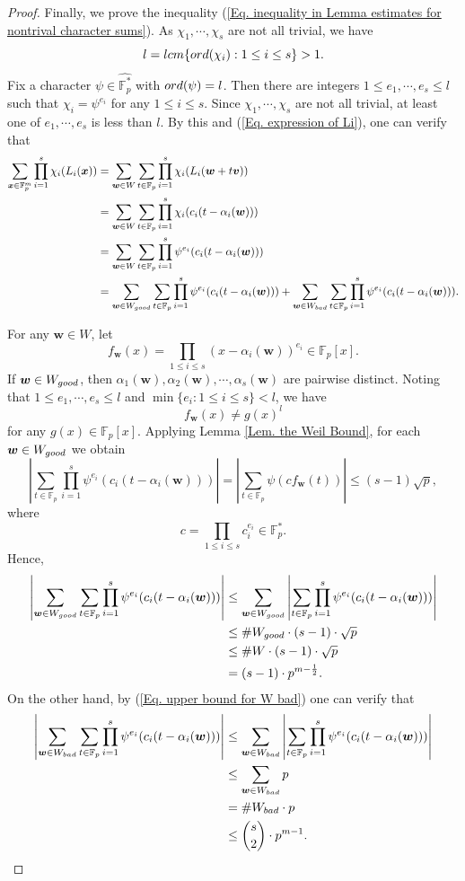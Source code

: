 \documentclass[10pt,a4paper]{amsart}
\def\lcm{\rm{lcm}}
\def\ord{{\rm ord}}
\def\v{{\bm v}}
\def\w{{\bm w}}
\def\x{{\bm x}}
\def\bad{{\rm bad}}
\def\good{{\rm good}}
\def\lcm{{\rm lcm}}
\begin{document}
\begin{proof}
Finally, we prove the inequality (\ref{Eq. inequality in Lemma estimates for nontrival character sums}). As $\chi_1,\cdots,\chi_s$ are not all trivial, we have 
$$l=\lcm\{\ord(\chi_i): 1\le i\le s\}>1.$$
Fix a character $\psi\in\widehat{\mathbb{F}_p^*}$ with $\ord(\psi)=l$. Then there are integers $1\le e_1,\cdots, e_s\le l$ such that $\chi_i=\psi^{e_i}$ for any $1\le i\le s$. Since $\chi_1,\cdots,\chi_s$ are not all trivial, at least one of $e_1,\cdots,e_s$ is less than $l$. By this and (\ref{Eq. expression of Li}), one can verify that 
\begin{align}\label{Eq. sum is equal to good plus bad}
	\sum_{\x\in\mathbb{F}_p^m}\prod_{i=1}^{s}\chi_i(L_i(\x))
&=\sum_{\w\in W}\sum_{t\in\mathbb{F}_p}\prod_{i=1}^{s}\chi_i(L_i(\w+t\v))\notag\\
&=\sum_{\w\in W}\sum_{t\in\mathbb{F}_p}\prod_{i=1}^{s}\chi_i(c_i(t-\alpha_i(\w)))\notag\\
&=\sum_{\w\in W}\sum_{t\in\mathbb{F}_p}\prod_{i=1}^{s}\psi^{e_i}(c_i(t-\alpha_i(\w)))\notag\\
&=\sum_{\w\in W_{\good}}\sum_{t\in\mathbb{F}_p}\prod_{i=1}^{s}\psi^{e_i}(c_i(t-\alpha_i(\w)))+\sum_{\w\in W_{\bad}}\sum_{t\in\mathbb{F}_p}\prod_{i=1}^{s}\psi^{e_i}(c_i(t-\alpha_i(\w))).
\end{align}
	
	For any $\w\in W$, let 
	$$f_{\w}(x)=\prod_{1\le i\le s}\left(x-\alpha_i(\w)\right)^{e_i}\in\mathbb{F}_p[x].$$
	If $\w\in W_{\good}$, then $\alpha_1(\w),\alpha_2(\w),\cdots, \alpha_s(\w)$ are pairwise distinct. Noting that $1\le e_1,\cdots,e_s\le l$ and $\min\{e_i: 1\le i\le s\}<l$, we have 
		$$f_{\w}(x)\neq g(x)^l$$
		for any $g(x)\in\mathbb{F}_p[x]$.  Applying Lemma \ref{Lem. the Weil Bound}, for each $\w\in W_{\good}$ we obtain 
$$\left|\sum_{t\in\mathbb{F}_p}\prod_{i=1}^{s}\psi^{e_i}(c_i(t-\alpha_i(\w)))\right|=\left|\sum_{t\in\mathbb{F}_p}\psi\left(cf_{\w}(t)\right)\right|\le (s-1)\sqrt{p},$$
where 
$$c=\prod_{1\le i\le s}c_i^{e_i}\in\mathbb{F}_p^*.$$
Hence, 
\begin{align}\label{Eq. estimate for good w}
	     \left|\sum_{\w\in W_{\good}}\sum_{t\in\mathbb{F}_p}\prod_{i=1}^{s}\psi^{e_i}(c_i(t-\alpha_i(\w)))\right|
&\le  \sum_{\w\in W_{\good}}\left|\sum_{t\in\mathbb{F}_p}\prod_{i=1}^{s}\psi^{e_i}(c_i(t-\alpha_i(\w)))\right|\notag\\
&\le \#W_{\good}\cdot (s-1)\cdot \sqrt{p}\notag\\
&\le \#W\cdot (s-1)\cdot \sqrt{p}\notag\\
&=(s-1)\cdot p^{m-\frac{1}{2}}.
\end{align}		
On the other hand, by (\ref{Eq. upper bound for W bad}) one can verify that 
\begin{align}\label{Eq. estimate for bad w}
	\left|\sum_{\w\in W_{\bad}}\sum_{t\in\mathbb{F}_p}\prod_{i=1}^{s}\psi^{e_i}(c_i(t-\alpha_i(\w)))\right|
&\le  \sum_{\w\in W_{\bad}}\left|\sum_{t\in\mathbb{F}_p}\prod_{i=1}^{s}\psi^{e_i}(c_i(t-\alpha_i(\w)))\right|\notag\\
&\le \sum_{\w\in W_{\bad}}p\notag\\
&=\#W_{\bad}\cdot p \notag\\
&\le \binom{s}{2}\cdot p^{m-1}.
\end{align}
		

\end{proof}
\end{document}
